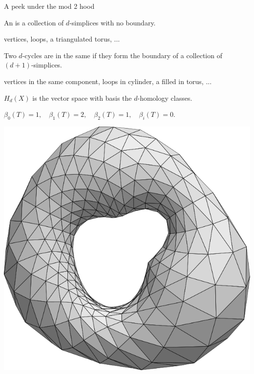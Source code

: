 \begin{frame}{A peek under the mod 2 hood}

	\pause
	 An  is a collection of $d$-simplices with no boundary.

	\pause\medskip
	 vertices, loops, a triangulated torus, ...

	\pause\bigskip
	 Two $d$-cycles are in the same  if they form the boundary of a collection of $(d+1)$-simplices.

	\pause\medskip
	 vertices in the same component, loops in cylinder, a filled in torus, ...

	\pause\bigskip
	 $H_d(X)$ is the vector space with basis the $d$-homology classes.

	\pause\bigskip
	 \quad $\beta_0(T) = 1, \quad \beta_1(T) = 2, \quad \beta_2(T) = 1, \quad \beta_i(T) = 0$.
	\begin{center}
		\includegraphics[scale=.1]{aux/torus_triangulated}
	\end{center}
\end{frame}

